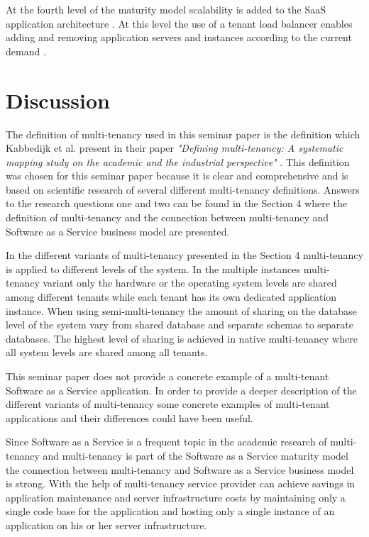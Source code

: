\documentclass[conference]{sasmoota2017}
\begin{document}
At the fourth level of the maturity model scalability is added to the SaaS application architecture \cite{Carraro:2006:ArchitectureLongTail}. At this level the use of a tenant load balancer enables adding and removing application servers and instances according to the current demand \cite{Carraro:2006:ArchitectureLongTail}.



\section{Discussion}

The definition of multi-tenancy used in this seminar paper is the definition which Kabbedijk et al. present in their paper \textit{"Defining multi-tenancy: A systematic mapping study on the academic and the industrial perspective"} \cite{Kabbedijk2015:Defining}. This definition was chosen for this seminar paper because it is clear and comprehensive and is based on scientific research of several different multi-tenancy definitions. Answers to the research questions one and two can be found in the Section 4 where the definition of multi-tenancy and the connection between multi-tenancy and Software as a Service business model are presented. 

In the different variants of multi-tenancy presented in the Section 4 multi-tenancy is applied to different levels of the system. In the multiple instances multi-tenancy variant only the hardware or the operating system levels are shared among different tenants while each tenant has its own dedicated application instance. When using semi-multi-tenancy the amount of sharing on the database level of the system vary from shared database and separate schemas to separate databases. The highest level of sharing is achieved in native multi-tenancy where all system levels are shared among all tenants. 

This seminar paper does not provide a concrete example of a multi-tenant Software as a Service application. In order to provide a deeper description of the different variants of multi-tenancy some concrete examples of multi-tenant applications and their differences could have been useful. 

Since Software as a Service is a frequent topic in the academic research of multi-tenancy and multi-tenancy is part of the Software as a Service maturity model the connection between multi-tenancy and Software as a Service business model is strong. With the help of multi-tenancy service provider can achieve savings in application maintenance and server infrastructure costs by maintaining only a single code base for the application and hosting only a single instance of an application on his or her server infrastructure. 
\end{document}
